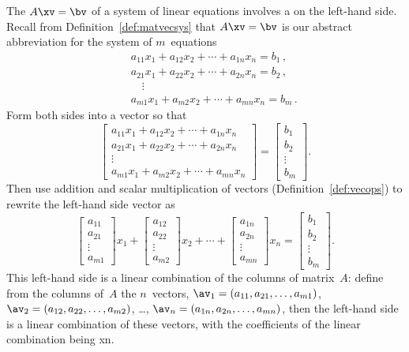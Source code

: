 \begin{example} \label{eg:lcmatvec}
The  \(A\xv=\bv\) of a system of linear equations involves a  on the left-hand side.
Recall from Definition~\ref{def:matvecsys} that \(A\xv=\bv\) is our abstract abbreviation for the system of \(m\)~equations
\begin{eqnarray*}
&&a_{11}x_1+a_{12}x_2+\cdots+a_{1n}x_n=b_1\,,
\\&&a_{21}x_1+a_{22}x_2+\cdots+a_{2n}x_n=b_2\,,
\\&&\quad\vdots
\\&&a_{m1}x_1+a_{m2}x_2+\cdots+a_{mn}x_n=b_m\,.
\end{eqnarray*}
Form both sides into a vector so that
\begin{equation*}
\begin{bmatrix} 
a_{11}x_1+a_{12}x_2+\cdots+a_{1n}x_n
\\a_{21}x_1+a_{22}x_2+\cdots+a_{2n}x_n
\\\vdots
\\a_{m1}x_1+a_{m2}x_2+\cdots+a_{mn}x_n
\end{bmatrix}
=\begin{bmatrix}b_1\\b_2\\\vdots\\b_m \end{bmatrix}.
\end{equation*}
Then use addition and scalar multiplication of vectors (Definition~\ref{def:vecops}) to rewrite the left-hand side vector as
\begin{equation*}
\begin{bmatrix} a_{11}\\a_{21}\\\vdots\\a_{m1}\end{bmatrix}x_1
+\begin{bmatrix} a_{12}\\a_{22}\\\vdots\\a_{m2}\end{bmatrix}x_2
+\cdots
+\begin{bmatrix} a_{1n}\\a_{2n}\\\vdots\\a_{mn}\end{bmatrix}x_n
=\begin{bmatrix} b_1\\b_2\\\vdots\\b_m \end{bmatrix}.
\end{equation*}
This left-hand side is a linear combination of the columns of matrix~\(A\): define from the columns of~\(A\) the \(n\)~vectors, \(\av_1=(a_{11},a_{21},\ldots,a_{m1})\), \(\av_2=(a_{12},a_{22},\ldots,a_{m2})\), \ldots, \(\av_n=(a_{1n},a_{2n},\ldots,a_{mn})\), then the left-hand side is a linear combination of these vectors, with the coefficients of the linear combination being \hlist xn.
\end{example}

